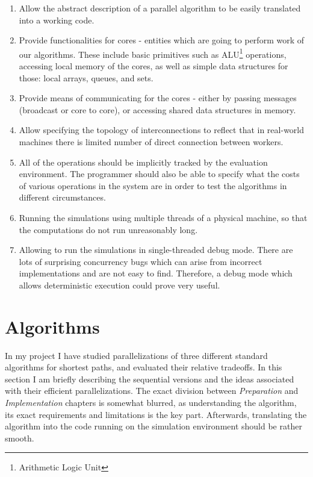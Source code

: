 \documentclass[12pt,a4paper,oneside,openright]{report}
\begin{document}
\begin{enumerate}
    \item Allow the abstract description of a parallel algorithm to be easily translated into a working code.
    \item Provide functionalities for cores - entities which are going to perform work of our algorithms. These include basic primitives such as ALU\footnote{Arithmetic Logic Unit} operations, accessing local memory of the cores, as well as simple data structures for those: local arrays, queues, and sets. 
    \item Provide means of communicating for the cores - either by passing messages (broadcast or core to core), or accessing shared data structures in memory.
    \item Allow specifying the topology of interconnections to reflect that in real-world machines there is limited number of direct connection between workers.
    \item All of the operations should be implicitly tracked by the evaluation environment. The programmer should also be able to specify what the costs of various operations in the system are in order to test the algorithms in different circumstances.
    \item Running the simulations using multiple threads of a physical machine, so that the computations do not run unreasonably long.
    \item Allowing to run the simulations in single-threaded debug mode. There are lots of surprising concurrency bugs which can arise from incorrect implementations and are not easy to find. Therefore, a debug mode which allows deterministic execution could prove very useful.
\end{enumerate}

\section{Algorithms}
In my project I have studied parallelizations of three different standard algorithms for shortest paths, and evaluated their relative tradeoffs. In this section I am briefly describing the sequential versions and the ideas associated with their efficient parallelizations. The exact division between \textit{Preparation} and \textit{Implementation} chapters is somewhat blurred, as understanding the algorithm, its exact requirements and limitations is the key part. Afterwards, translating the algorithm into the code running on the simulation environment should be rather smooth.
\end{document}
